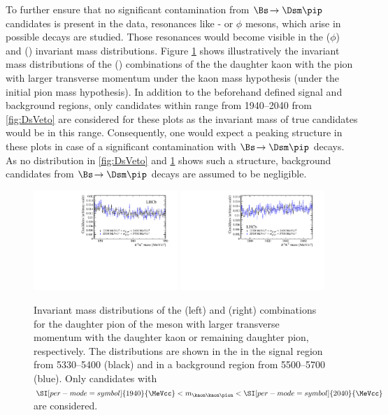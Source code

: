 To further ensure that no significant contamination from $\Bs\!\to\Dsm\pip$ candidates is present in the data, resonances like \Kstarz- or $\phi$ mesons, which arise in possible \Dsm decays are studied.
Those resonances would become visible in the \kaon\kaon ($\phi$) and \kaon\pion (\Kstarz) invariant mass distributions.
Figure \ref{fig:phi_Kst_veto} shows illustratively the invariant mass distributions of the \kaon\kaon (\kaon\pion) combinations of the the daughter kaon with the
pion with larger transverse momentum under the kaon mass hypothesis (under the initial pion mass hypothesis).
In addition to the beforehand defined signal and background regions, only candidates within \a range from \SIrange[per-mode=symbol]{1940}{2040}{\MeVcc} from \cref{fig:DsVeto} are considered for these plots as the invariant mass of true \Ds candidates would be in this range.
Consequently, one would expect a peaking structure in these plots in case of a significant contamination with $\Bs\!\to\Dsm\pip$ decays.
As no distribution in \cref{fig:DsVeto} and \cref{fig:phi_Kst_veto} shows such a structure, background candidates from $\Bs\!\to\Dsm\pip$ decays are assumed to be negligible.
\begin{figure}[tbp]
    \centering
    \includegraphics[width=0.485\textwidth]{06selection/figs/KstarHypo2.pdf}
    \includegraphics[width=0.485\textwidth]{06selection/figs/PhiHypo2.pdf}
    \caption{Invariant mass distributions of the \kaon\pion (left) and \kaon\kaon (right) combinations for the daughter pion of the \Dm meson with larger transverse momentum with the daughter kaon or remaining daughter pion, respectively.
    The distributions are shown in the in the \Bs signal region from \SIrange[per-mode=symbol]{5330}{5400}{\MeVcc} (black) and in a background region from \SIrange[per-mode=symbol]{5500}{5700}{\MeVcc} (blue).
    Only candidates with $\SI[per-mode=symbol]{1940}{\MeVcc}<m_{\kaon\kaon\pion}<\SI[per-mode=symbol]{2040}{\MeVcc}$ are considered.}
    \label{fig:phi_Kst_veto}
\end{figure}

